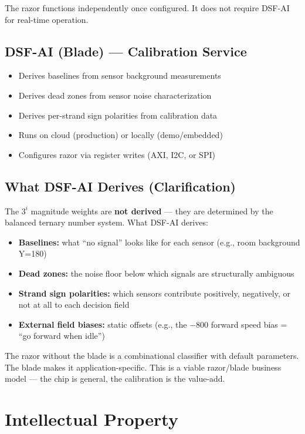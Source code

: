 \documentclass[11pt, a4paper]{article}
\begin{document}
The razor functions independently once configured. It does not
require DSF-AI for real-time operation.

\subsection{DSF-AI (Blade) — Calibration Service}

\begin{itemize}[nosep]
  \item Derives baselines from sensor background measurements
  \item Derives dead zones from sensor noise characterization
  \item Derives per-strand sign polarities from calibration data
  \item Runs on cloud (production) or locally (demo/embedded)
  \item Configures razor via register writes (AXI, I2C, or SPI)
\end{itemize}

\subsection{What DSF-AI Derives (Clarification)}

The $3^i$ magnitude weights are \textbf{not derived} — they are
determined by the balanced ternary number system. What DSF-AI
derives:
\begin{itemize}[nosep]
  \item \textbf{Baselines:} what ``no signal'' looks like for each
        sensor (e.g., room background Y=180)
  \item \textbf{Dead zones:} the noise floor below which signals
        are structurally ambiguous
  \item \textbf{Strand sign polarities:} which sensors contribute
        positively, negatively, or not at all to each decision field
  \item \textbf{External field biases:} static offsets (e.g., the
        $-800$ forward speed bias = ``go forward when idle'')
\end{itemize}

The razor without the blade is a combinational classifier with
default parameters. The blade makes it application-specific.
This is a viable razor/blade business model — the chip is general,
the calibration is the value-add.

\section{Intellectual Property}
\end{document}
